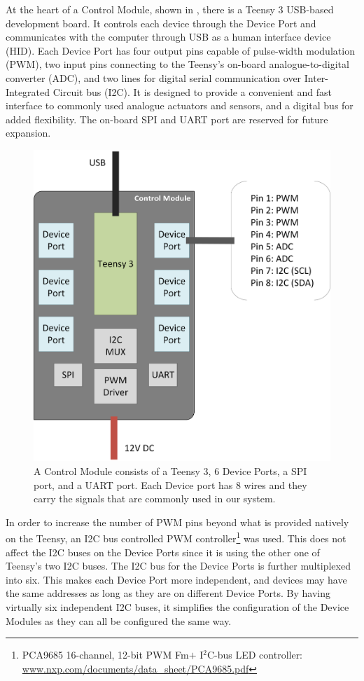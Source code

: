 

At the heart of a Control Module, shown in , there is a Teensy 3 USB-based development board. It controls each device through the Device Port and communicates with the computer through USB as a human interface device (HID). Each Device Port has four output pins capable of pulse-width modulation (PWM), two input pins connecting to the Teensy's on-board analogue-to-digital converter (ADC), and two lines for digital serial communication over Inter-Integrated Circuit bus (I2C). It is designed to provide a convenient and fast interface to commonly used analogue actuators and sensors, and a digital bus for added flexibility. The on-board SPI and UART port are reserved for future expansion.

\begin{figure}[!htb]
	\centering
	\includegraphics[width=0.68 \textwidth]{"fig/interactive control system/Control_Module"}
	\caption[Block diagram of the Control Module]{A Control Module consists of a Teensy 3, 6 Device Ports, a SPI port, and a UART port. Each Device port has 8 wires and they carry the signals that are commonly used in our system.}
	\label{fig:Control_Module}
\end{figure}

In order to increase the number of PWM pins beyond what is provided natively on the Teensy, an I2C bus controlled PWM controller\footnote{PCA9685 16-channel, 12-bit PWM Fm$+$ I$^2$C-bus LED controller: \url{www.nxp.com/documents/data_sheet/PCA9685.pdf}} was used. This does not affect the I2C buses on the Device Ports since it is using the other one of Teensy's two I2C buses. The I2C bus for the Device Ports is further multiplexed into six. This makes each Device Port more independent, and devices may have the same addresses as long as they are on different Device Ports. By having virtually six independent I2C buses, it simplifies the configuration of the Device Modules as they can all be configured the same way.